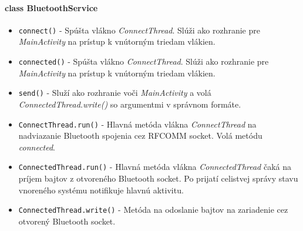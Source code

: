 \documentclass[12pt, a4paper]{article}
\begin{document}
\paragraph{class BluetoothService}
\begin{itemize}
\itemsep0pt
\item \verb|connect()| - Spúšta vlákno \emph{ConnectThread}. Slúži ako rozhranie pre \emph{MainActivity} na prístup k vnútorným triedam vlákien.
\item \verb|connected()| - Spúšta vlákno \emph{ConnectThread}. Slúži ako rozhranie pre \emph{MainActivity} na prístup k vnútorným triedam vlákien.
\item \verb|send()| - Služí ako rozhranie voči \emph{MainActivity} a volá \emph{ConnectedThread.write()} so argumentmi v správnom formáte.
\item \verb|ConnectThread.run()| - Hlavná metóda vlákna \emph{ConnectThread} na nadviazanie Bluetooth spojenia cez RFCOMM socket. Volá metódu \emph{connected}.
\item \verb|ConnectedThread.run()|  - Hlavná metóda vlákna \emph{ConnectedThread} čaká na príjem bajtov z otvoreného Bluetooth socket. Po prijatí celistvej správy stavu vnoreného systému notifikuje hlavnú aktivitu.
\item \verb|ConnectedThread.write()| - Metóda na odoslanie bajtov na zariadenie cez otvorený Bluetooth socket.
\end{itemize}
\end{document}
